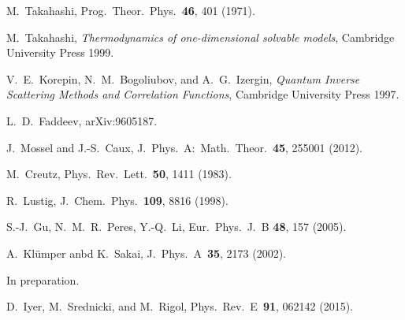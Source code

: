 \documentclass[twocolumn,superscriptaddress,prb,10pt]{revtex4-1}
\begin{document}
\begin{thebibliography}{99}
M.~Takahashi, Prog.\ Theor.\ Phys.\ {\bf 46}, 401 (1971). 

M.~Takahashi, {\it Thermodynamics of one-dimensional solvable models}, 
Cambridge University Press 1999. 

V.~E.~Korepin, N.~M.~Bogoliubov, and A.~G.~Izergin, \emph{Quantum 
Inverse Scattering Methods and Correlation Functions}, Cambridge 
University Press 1997. 

L.~D.~Faddeev, arXiv:9605187.

J.~Mossel and J.-S.~Caux, J.\ Phys.\ A:\ Math.\ Theor.\ {\bf 45}, 
255001 (2012). 


M.~Creutz, Phys.\ Rev.\ Lett.\ {\bf 50}, 1411 (1983).

R.~Lustig, J.\ Chem.\ Phys.\ {\bf 109}, 8816 (1998).

S.-J.~Gu, N.~M.~R.~Peres, Y.-Q.~Li, Eur.\ Phys.\ J.\ B {\bf 48}, 157 (2005). 

A.~Kl\"umper anbd K.~Sakai, J.\ Phys.\ A\ {\bf 35}, 2173 (2002).

In preparation. 


D.~Iyer, M.~Srednicki, and M.~Rigol, Phys.\ Rev.\ E\ {\bf 91}, 062142 (2015).

 \end{thebibliography}
\end{document}

